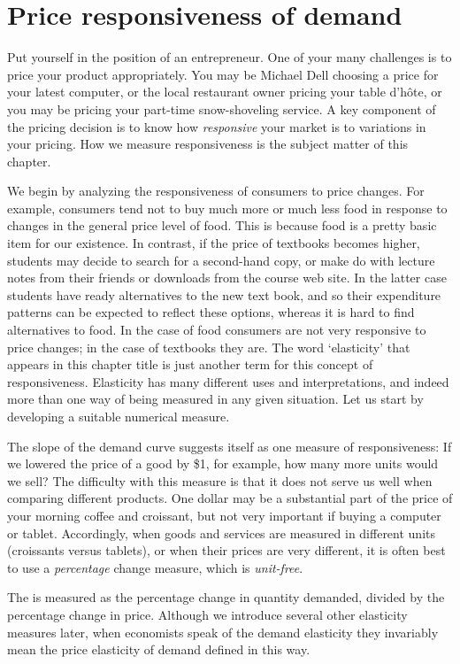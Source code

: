 \section{Price responsiveness of demand}\label{sec:ch4sec1}

Put yourself in the position of an entrepreneur. One of your many challenges
is to price your product appropriately. You may be Michael Dell choosing a
price for your latest computer, or the local restaurant owner pricing your
table d'h\^{o}te, or you may be pricing your part-time snow-shoveling
service. A key component of the pricing decision is to know how \textit{%
responsive} your market is to variations in your pricing. How we measure
responsiveness is the subject matter of this chapter.

We begin by analyzing the responsiveness of consumers to price changes. For
example, consumers tend not to buy much more or much less food in response
to changes in the general price level of food. This is because food is a
pretty basic item for our existence. In contrast, if the price of textbooks
becomes higher, students may decide to search for a second-hand copy, or
make do with lecture notes from their friends or downloads from the course
web site. In the latter case students have ready alternatives to the new
text book, and so their expenditure patterns can be expected to reflect
these options, whereas it is hard to find alternatives to food. In the case
of food consumers are not very responsive to price changes; in the case of
textbooks they are. The word `elasticity' that appears in this chapter title
is just another term for this concept of responsiveness. Elasticity has many
different uses and interpretations, and indeed more than one way of being
measured in any given situation. Let us start by developing a suitable
numerical measure.

The slope of the demand curve suggests itself as one measure of
responsiveness: If we lowered the price of a good by \$1, for example, how
many more units would we sell? The difficulty with this measure is that it
does not serve us well when comparing different products. One dollar may be
a substantial part of the price of your morning coffee and croissant, but
not very important if buying a computer or tablet. Accordingly, when goods
and services are measured in different units (croissants versus tablets), or
when their prices are very different, it is often best to use a \textit{%
percentage} change measure, which is \textit{unit-free}.

The  is measured as the percentage
change in quantity demanded, divided by the percentage change in price.
Although we introduce several other elasticity measures later, when
economists speak of the demand elasticity they invariably mean the price
elasticity of demand defined in this way.


